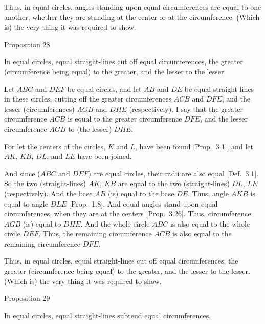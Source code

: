 Thus, in equal circles, angles standing upon equal circumferences  are equal to one
another, whether they are standing at the center or at the circumference.
(Which is) the very thing it was required to show.


\begin{center}
{\large Proposition 28}
\end{center}

 In equal circles, equal straight-lines cut off equal circumferences, 
the greater (circumference being equal) to the greater, and the lesser to the lesser.

Let $ABC$ and $DEF$ be equal circles, and let $AB$ and $DE$ be equal straight-lines
in these circles, cutting off the greater circumferences $ACB$ and $DFE$, 
and the lesser (circumferences) $AGB$ and $DHE$ (respectively). I say that
the greater circumference $ACB$ is equal to the greater circumference $DFE$,
and the lesser circumference $AGB$ to (the lesser) $DHE$.

\epsfysize=1.6in
\centerline{}

For let the centers of the circles, $K$ and $L$, have been found [Prop.~3.1],
and let $AK$, $KB$, $DL$, and $LE$ have been joined.

And since ($ABC$ and $DEF$) are equal circles, their radii are also equal [Def.~3.1]. So the two
(straight-lines) $AK$, $KB$ are equal to the two (straight-lines) $DL$, $LE$ (respectively).
And the base $AB$ (is) equal to the base $DE$. Thus, angle $AKB$ is equal
to angle $DLE$ [Prop.~1.8]. And equal angles stand upon equal circumferences,
when they are at the centers [Prop.~3.26]. Thus, circumference $AGB$
(is) equal to $DHE$. And the whole circle $ABC$ is also equal to the whole
circle $DEF$. Thus, the remaining circumference $ACB$
is also equal to the remaining circumference $DFE$.

Thus, in equal circles, equal straight-lines cut off equal circumferences, 
the greater (circumference being equal) to the greater, and the lesser to the lesser. (Which is) the very thing it was required to show.


\begin{center}
{\large Proposition 29}
\end{center}

 In equal circles, equal straight-lines subtend equal circumferences.

